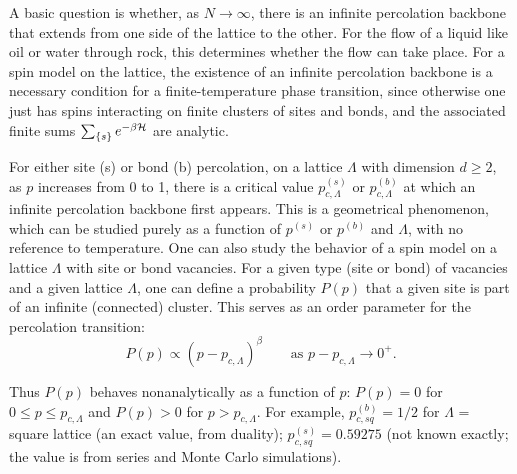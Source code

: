 A basic question is whether, as $N\to\infty$, there is an infinite percolation backbone that extends from one side of the
lattice to the other. For the flow of a liquid like oil or water through rock, this determines whether the flow can take
place. For a spin model on the lattice, the existence of an infinite percolation backbone is a necessary condition for a
finite-temperature phase transition, since otherwise one just has spins interacting on finite clusters of sites and bonds,
and the associated finite sums $\sum_{\{s\}}e^{-\beta\mathcal{H}}$ are analytic.

For either site (s) or bond (b) percolation, on a lattice $\Lambda$ with dimension $d\ge 2$, as $p$ increases from 0 to 1,
there is a critical value $p_{c,\Lambda}^{(s)}$ or $p_{c,\Lambda}^{(b)}$ at which an infinite percolation backbone first
appears. This is a geometrical phenomenon, which can be studied purely as a function of $p^{(s)}$ or $p^{(b)}$ and
$\Lambda$, with no reference to temperature. One can also study the behavior of a spin model on a lattice $\Lambda$ with
site or bond vacancies. For a given type (site or bond) of vacancies and a given lattice $\Lambda$, one can define a
probability $P(p)$ that a given site is part of an infinite (connected) cluster. This serves as an order parameter for the
percolation transition:
\begin{equation}
  P(p)\propto(p-p_{c,\Lambda})^\beta\qquad\text{as } p-p_{c,\Lambda}\to 0^+ .
\end{equation}

\begin{diagram}
\end{diagram}

Thus $P(p)$ behaves nonanalytically as a function of $p$: $P(p) = 0$ for $0\le p\le p_{c,\Lambda}$ and $P(p)>0$ for
$p>p_{c,\Lambda}$. For example, $p_{c,sq}^{(b)} = 1/2$ for $\Lambda$ = square lattice (an exact value, from duality);
$p_{c,sq}^{(s)} = 0.59275$ (not known exactly; the value is from series and Monte Carlo simulations).

